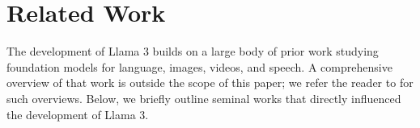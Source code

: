 \section{Related Work}
\label{section:related_work}
The development of Llama 3 builds on a large body of prior work studying foundation models for language, images, videos, and speech.
A comprehensive overview of that work is outside the scope of this paper; we refer the reader to \citet{bordes2024vlm,madan2024foundation,LLMSurvey} for such overviews.
Below, we briefly outline seminal works that directly influenced the development of Llama 3.



